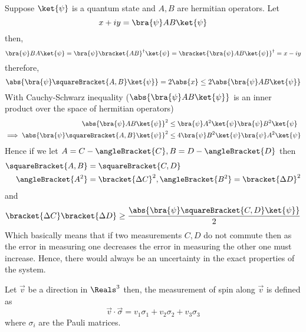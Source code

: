 \begin{remark}
    Suppose \(\ket{\psi}\) is a quantum state and \(A,B\) are hermitian operators. Let 
    \begin{equation*}
        x + iy = \bra{\psi} AB \ket{\psi}
    \end{equation*}
    then, 
    \begin{equation*}
        \bra{\psi} BA \ket{\psi} = \bra{\psi} \bracket{AB}^{\dagger} \ket{\psi} = \bracket{ \bra{\psi} AB \ket{\psi}}^{\dagger} = x - iy
    \end{equation*}
    therefore, 
    \begin{equation*}
        \abs{\bra{\psi} \squareBracket{A,B} \ket{\psi}} = 2\abs{x} \leq 2 \abs{\bra{\psi} AB \ket{\psi}}
    \end{equation*}
    With Cauchy-Schwarz inequality (\(\abs{\bra{\psi}AB \ket{\psi}}\) is an inner product over the space of hermitian operators)
    \begin{align*}
        \abs{\bra{\psi} AB \ket{\psi}}^2 &\leq \bra{\psi} A^2 \ket{\psi} \bra{\psi} B^2 \ket{\psi}\\
        \implies \abs{\bra{\psi} \squareBracket{A,B} \ket{\psi}}^2 &\leq 4  \bra{\psi} B^2 \ket{\psi} \bra{\psi} A^2 \ket{\psi}
    \end{align*}
    Hence if we let \(A = C - \angleBracket{C}, B = D - \angleBracket{D}\) then 
    \begin{align*}
        \squareBracket{A,B} &= \squareBracket{C,D} \\
        \angleBracket{A^2} &= \bracket{\Delta C}^2 , \angleBracket{B^2} = \bracket{\Delta D}^2
    \end{align*}
    and 
    \begin{equation*}
        \bracket{\Delta C} \bracket{\Delta D} \geq \dfrac{\abs{\bra{\psi} \squareBracket{C,D} \ket{\psi}}}{2}
    \end{equation*}
    Which basically means that if two measurements \(C,D\) do not commute then as the error in measuring one decreases the error in measuring the other one must increase. Hence, there would always be an uncertainty in the exact properties of the system.
\end{remark}
Let \(\vec{v}\) be a direction in \(\Reals^3\) then, the measurement of spin along \(\vec{v}\) is defined as 
\begin{equation*}
    \vec{v} \cdot \vec{\sigma} = v_1 \sigma_1  + v_2 \sigma_2 + v_3 \sigma_3
\end{equation*}
where \(\sigma_i\) are the Pauli matrices.


